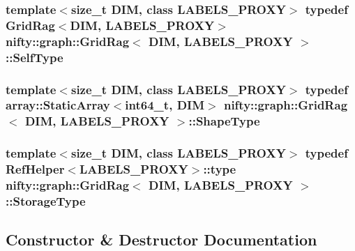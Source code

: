 \subsubsection[{Self\+Type}]{\setlength{\rightskip}{0pt plus 5cm}template$<$size\+\_\+t D\+I\+M, class L\+A\+B\+E\+L\+S\+\_\+\+P\+R\+O\+X\+Y$>$ typedef {\bf Grid\+Rag}$<$D\+I\+M, L\+A\+B\+E\+L\+S\+\_\+\+P\+R\+O\+X\+Y$>$ {\bf nifty\+::graph\+::\+Grid\+Rag}$<$ D\+I\+M, L\+A\+B\+E\+L\+S\+\_\+\+P\+R\+O\+X\+Y $>$\+::{\bf Self\+Type}}\label{classnifty_1_1graph_1_1GridRag_aa5e47cff6ae70d13254abc3382b3b166}
\hypertarget{classnifty_1_1graph_1_1GridRag_a3693e007e1419dec9751cca751a1061d}{}
\subsubsection[{Shape\+Type}]{\setlength{\rightskip}{0pt plus 5cm}template$<$size\+\_\+t D\+I\+M, class L\+A\+B\+E\+L\+S\+\_\+\+P\+R\+O\+X\+Y$>$ typedef {\bf array\+::\+Static\+Array}$<$int64\+\_\+t, D\+I\+M$>$ {\bf nifty\+::graph\+::\+Grid\+Rag}$<$ D\+I\+M, L\+A\+B\+E\+L\+S\+\_\+\+P\+R\+O\+X\+Y $>$\+::{\bf Shape\+Type}}\label{classnifty_1_1graph_1_1GridRag_a3693e007e1419dec9751cca751a1061d}
\hypertarget{classnifty_1_1graph_1_1GridRag_ae7dcf657b20ef49d062648978e192cdb}{}
\subsubsection[{Storage\+Type}]{\setlength{\rightskip}{0pt plus 5cm}template$<$size\+\_\+t D\+I\+M, class L\+A\+B\+E\+L\+S\+\_\+\+P\+R\+O\+X\+Y$>$ typedef {\bf Ref\+Helper}$<$L\+A\+B\+E\+L\+S\+\_\+\+P\+R\+O\+X\+Y$>$\+::type {\bf nifty\+::graph\+::\+Grid\+Rag}$<$ D\+I\+M, L\+A\+B\+E\+L\+S\+\_\+\+P\+R\+O\+X\+Y $>$\+::{\bf Storage\+Type}\hspace{0.3cm}{\ttfamily [protected]}}\label{classnifty_1_1graph_1_1GridRag_ae7dcf657b20ef49d062648978e192cdb}


\subsection{Constructor \& Destructor Documentation}
\hypertarget{classnifty_1_1graph_1_1GridRag_ae00a91d33acff711f967d2d57bde8cec}{}
